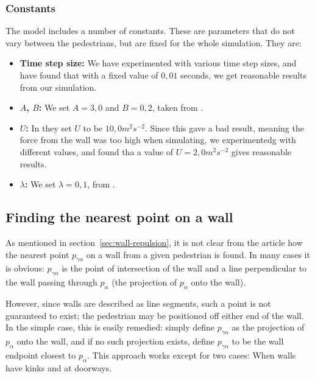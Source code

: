 \subsubsection{Constants} \label{constants}
The model includes a number of constants. These are parameters that do not 
vary between the pedestrians, but are fixed for the whole simulation. They are:

\begin{itemize}
    \item \textbf{Time step size:} We have experimented with various time step 
        sizes, and have found that with a fixed value of $0,01$ seconds, we 
        get reasonable results from our simulation.

    \item \textbf{$A$, $B$:} We set $A=3,0$ and $B=0,2$, taken from  
        \cite{ABconstant}.

    \item \textbf{$U$:} In \cite{social-force} they set $U$ to be $10,0 m^2 s^{-2}$.
	Since this gave a bad result, meaning the force from the wall was too high
	when simulating, we experimentedg with different values, and found tha
	a value of $U=2,0 m^2 s^{-2}$ gives reasonable results.
 
 
        \item \textbf{$\lambda$:} We set $\lambda=0,1$, from 
            \cite{ABconstant}.
\end{itemize}

\subsection{Finding the nearest point on a wall}
\label{sec:repulsion-points}
As mentioned in section~\ref{sec:wall-repulsion}, it is not clear from the 
article how the nearest point $p_{\gamma \alpha}$ on a wall from a given 
pedestrian is found. In many cases it is obvious: $p_{\gamma \alpha}$ is the 
point of intersection of the wall and a line perpendicular to the wall passing 
through $p_\alpha$ (the projection of $p_\alpha$ onto the wall).

However, since walls are described as line segments, such a point is not 
guaranteed to exist; the pedestrian may be positioned off either end of the 
wall. In the simple case, this is easily remedied: simply define $p_{\gamma 
\alpha}$ as the projection of $p_\alpha$ onto the wall, and if no such 
projection exists, define $p_{\gamma \alpha}$ to be the wall endpoint closest 
to $p_\alpha$. This approach works except for two cases: When walls have kinks 
and at doorways.

